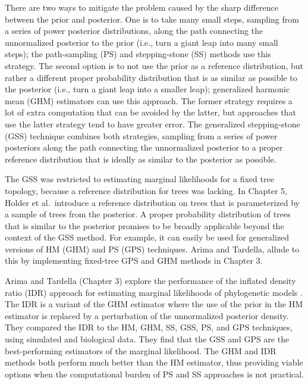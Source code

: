 \documentclass[letterpaper,12pt]{article}
\begin{document}
There are two ways to mitigate the problem caused by the sharp difference
between the prior and posterior.
One is to take many small steps, sampling from a series of power posterior
distributions, along the path connecting the unnormalized posterior to the
prior (i.e., turn a giant leap into many small steps);
the path-sampling (PS) \citep{Lartillot2006} and stepping-stone (SS)
\citep{Xie2011} methods use this strategy.
The second option is to not use the prior as a reference distribution, but
rather a different proper probability distribution that is as similar as
possible to the posterior (i.e., turn a giant leap into a smaller leap); 
generalized harmonic mean (GHM) estimators \citep{Gelfand1994} can use
this approach.
The former strategy requires a lot of extra computation that can be avoided by
the latter, but approaches that use the latter strategy tend to have greater
error.
The generalized stepping-stone (GSS) technique \citep{Fan2011} combines both
strategies, sampling from a series of power posteriors along the path
connecting the unnormalized posterior to a proper reference distribution that
is ideally as similar to the posterior as possible.

The GSS was restricted to estimating marginal likelihoods for a fixed tree
topology, because a reference distribution for trees was lacking.
In Chapter 5, Holder et al.\ introduce a reference distribution on trees that
is parameterized by a sample of trees from the posterior.
A proper probability distribution of trees that is similar to the posterior
promises to be broadly applicable beyond the context of the GSS method.
For example, it can easily be used for generalized versions of HM (GHM) and PS
(GPS) techniques.
Arima and Tardella, allude to this by implementing fixed-tree GPS and GHM
methods in Chapter 3.


Arima and Tardella (Chapter 3) explore the performance of the inflated density
ratio (IDR) approach for estimating marginal likelihoods of phylogenetic models
\citep{Arima2012}.
The IDR is a variant of the GHM estimator where the use of the prior in the HM
estimator is replaced by a perturbation of the unnormalized posterior density.
They compared the IDR to the HM, GHM, SS, GSS, PS, and GPS techniques,
using simulated and biological data.
They find that the GSS and GPS are the best-performing estimators of the
marginal likelihood.
The GHM and IDR methods both perform much better than the HM estimator, thus
providing viable options when the computational burden of PS and SS approaches
is not practical.
\end{document}
